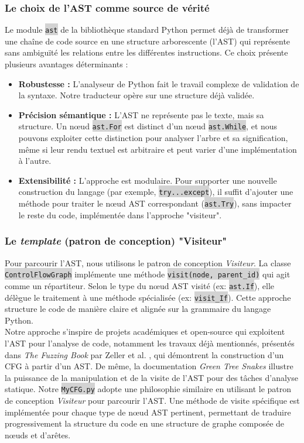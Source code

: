 \documentclass[11pt,a4paper]{article}
\let\cite\parencite
\newcommand{\code}[1]{\colorbox{lightgray}{\texttt{\small #1}}}
\begin{document}
\subsubsection{Le choix de l'AST comme source de vérité}
Le module \code{ast} de la bibliothèque standard Python permet déjà de transformer une chaîne de code source en une 
structure arborescente (l'AST) qui représente sans ambiguïté les relations entre les différentes instructions. 
Ce choix présente plusieurs avantages déterminants :
\begin{itemize}
    \item \textbf{Robustesse :} L'analyseur de Python fait le travail complexe de validation de la syntaxe. Notre traducteur opère sur une structure déjà validée.
    \item \textbf{Précision sémantique :} L'AST ne représente pas le texte, mais sa structure. Un nœud \code{ast.For} est distinct d'un nœud \code{ast.While}, et nous pouvons exploiter cette distinction pour analyser l'arbre et sa signification, même si leur rendu textuel est arbitraire et peut varier d'une implémentation à l'autre.  
    \item \textbf{Extensibilité :} L'approche est modulaire. Pour supporter une nouvelle construction du langage (par exemple, \code{try...except}), il suffit d'ajouter une méthode pour traiter le nœud AST correspondant (\code{ast.Try}), sans impacter le reste du code, implémentée dans l'approche "visiteur".
\end{itemize}

\subsubsection{Le \textit{template} (patron de conception) "Visiteur"}
Pour parcourir l'AST, nous utilisons le patron de conception \textit{Visiteur}. La classe \code{ControlFlowGraph} implémente une méthode \code{visit(node, parent\_id)} qui agit comme un répartiteur. Selon le type du nœud AST visité (ex: \code{ast.If}), elle délègue le traitement à une méthode spécialisée (ex: \code{visit\_If}). Cette approche structure le code de manière claire et alignée sur la grammaire du langage Python.
\\
Notre approche s'inspire de projets académiques et open-source qui exploitent l'AST pour l'analyse de code, 
notamment les travaux déjà mentionnés, présentés dans \textit{The Fuzzing Book} par Zeller et al. \cite{fuzzingbook}, qui 
démontrent la construction d'un CFG à partir d'un AST. De même, la documentation \textit{Green Tree Snakes} 
\cite{greentreesnakes} illustre la puissance de la manipulation et de la visite de l'AST pour des tâches 
d'analyse statique. Notre \code{MyCFG.py} adopte une philosophie similaire en utilisant le patron de conception 
\textit{Visiteur} pour parcourir l'AST. Une méthode de visite spécifique est implémentée pour chaque type de 
nœud AST pertinent, permettant de traduire progressivement la structure du code en une structure de graphe 
composée de nœuds et d'arêtes.
\end{document}
